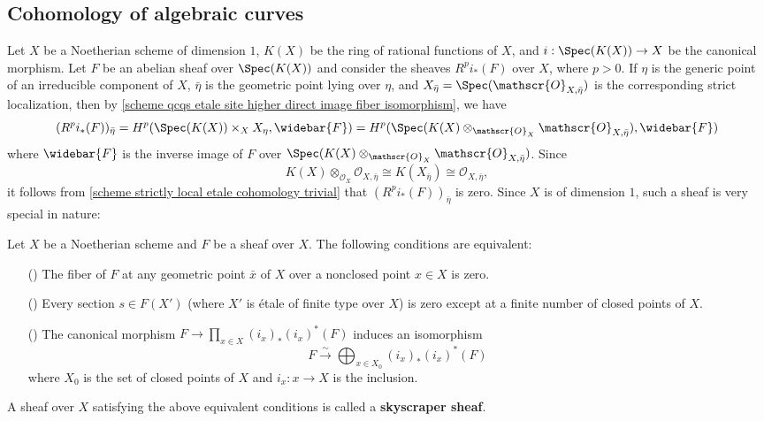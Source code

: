 \subsection{Cohomology of algebraic curves}
Let $X$ be a Noetherian scheme of dimension $1$, $K(X)$ be the ring of rational functions of $X$, and $i:\Spec(K(X))\to X$ be the canonical morphism. Let $F$ be an abelian sheaf over $\Spec(K(X))$ and consider the sheaves $R^pi_*(F)$ over $X$, where $p>0$. If $\eta$ is the generic point of an irreducible component of $X$, $\bar{\eta}$ is the geometric point lying over $\eta$, and $X_{\bar{\eta}}=\Spec(\mathscr{O}_{X,\bar{\eta}})$ is the corresponding strict localization, then by \cref{scheme qcqs etale site higher direct image fiber isomorphism}, we have
\[(R^pi_*(F))_{\bar{\eta}}=H^p(\Spec(K(X))\times_XX_\eta,\widebar{F})=H^p(\Spec(K(X)\otimes_{\mathscr{O}_X}\mathscr{O}_{X,\bar{\eta}}),\widebar{F})\]
where $\widebar{F}$ is the inverse image of $F$ over $\Spec(K(X)\otimes_{\mathscr{O}_X}\mathscr{O}_{X,\bar{\eta}})$. Since
\[K(X)\otimes_{\mathscr{O}_X}\mathscr{O}_{X,\bar{\eta}}\cong K(X_{\bar{\eta}})\cong \mathscr{O}_{X,\bar{\eta}},\]
it follows from \cref{scheme strictly local etale cohomology trivial} that $(R^pi_*(F))_{\bar{\eta}}$ is zero. Since $X$ is of dimension $1$, such a sheaf is very special in nature:
\begin{lemma}\label{scheme Noe skyscraper sheaf char}
Let $X$ be a Noetherian scheme and $F$ be a sheaf over $X$. The following conditions are equivalent:
\begin{enumerate}
    \item[(\rmnum{1})] The fiber of $F$ at any geometric point $\bar{x}$ of $X$ over a nonclosed point $x\in X$ is zero.
    \item[(\rmnum{2})] Every section $s\in F(X')$ (where $X'$ is \'etale of finite type over $X$) is zero except at a finite number of closed points of $X$.
    \item[(\rmnum{3})] The canonical morphism $F\to\prod_{x\in X}(i_x)_*(i_x)^*(F)$ induces an isomorphism
    \[F \stackrel{\sim}{\to} \bigoplus_{x\in X_0}(i_x)_*(i_x)^*(F)\]
    where $X_0$ is the set of closed points of $X$ and $i_x:x\to X$ is the inclusion.
\end{enumerate}
A sheaf over $X$ satisfying the above equivalent conditions is called a \textbf{skyscraper sheaf}.
\end{lemma}
